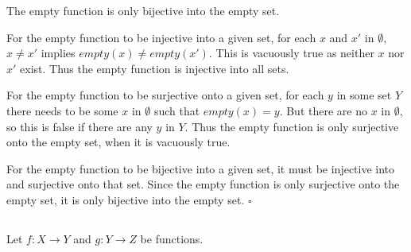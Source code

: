 \documentclass[../../main.tex]{subfiles}
\begin{document}
\begin{ans}
    The empty function is only bijective into the empty set.
\end{ans}

\begin{prf}
    For the empty function to be injective into a given set, for each $x$ and $x'$ in $\emptyset$, $x \neq x'$ implies $empty(x) \neq empty(x')$.
    This is vacuously true as neither $x$ nor $x'$ exist.
    Thus the empty function is injective into all sets.
    
    For the empty function to be surjective onto a given set, for each $y$ in some set $Y$ there needs to be some $x$ in $\emptyset$ such that $empty(x)=y$.
    But there are no $x$ in $\emptyset$, so this is false if there are any $y$ in $Y$.
    Thus the empty function is only surjective onto the empty set, when it is vacuously true.
    
    For the empty function to be bijective into a given set, it must be injective into and surjective onto that set. Since the empty function is only surjective onto the empty set, it is only bijective into the empty set.
    $\square$
\end{prf}

\subsection{}
\begin{q}
Let $f: X \to Y$ and $g: Y \to Z$ be functions.
\end{q}
\end{document}
